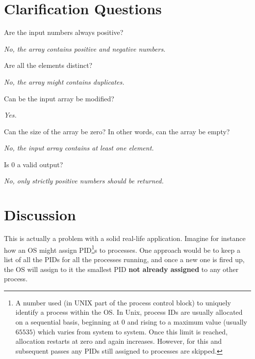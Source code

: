 \section{Clarification Questions}

\begin{QandA}
	\item Are the input numbers always positive?
	\begin{answered}
		\textit{No, the array contains positive and negative numbers.}
	\end{answered}

	\item Are all the elements distinct?
	\begin{answered}
		\textit{No, the array might contains duplicates.}
	\end{answered}
	
	\item Can be the input array be modified?
	\begin{answered}
		\textit{Yes.}
	\end{answered}

	\item Can the size of the array be zero? In other words, can the array be empty?
	\begin{answered}
		\textit{No, the input array contains at least one element.}
	\end{answered}

	\item Is $0$ a valid output?
	\begin{answered}
		\textit{No, only strictly positive numbers should be returned.}
	\end{answered}

\end{QandA}

\section{Discussion}
\label{first_positive_missing:sec:discussion}
This is actually a problem with a solid real-life application.
Imagine for instance how an OS might assign PID\footnote{A number used (in UNIX part of the process control block) to uniquely identify a process within the OS. In Unix, process IDs are usually allocated on a sequential basis, beginning at 0 and rising to a maximum value (usually $65535$) which varies from system to system. Once this limit is reached, allocation restarts at zero and again increases. However, for this and subsequent passes any PIDs still assigned to processes are skipped.}s to processes. One approach would be to keep a list of all the PIDs for all the processes running, and once a new one is fired up, the OS will assign to it the smallest PID \textbf{not already assigned} to any other process.

